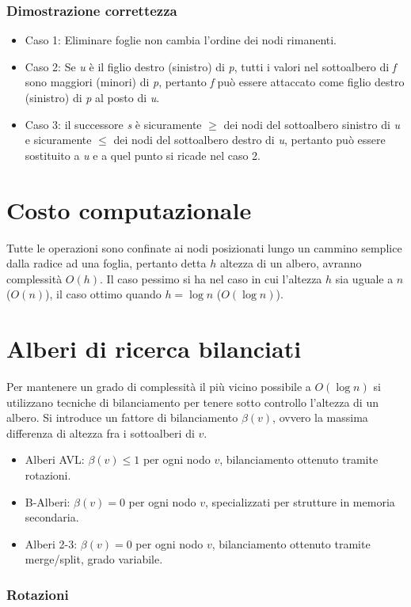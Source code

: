 \subsubsection{Dimostrazione correttezza}
\begin{itemize}
    \item Caso 1: Eliminare foglie non cambia l'ordine dei nodi rimanenti.
    \item Caso 2: Se \emph{u} \`e il figlio destro (sinistro) di \emph{p}, tutti i valori nel sottoalbero di \emph{f} sono maggiori (minori) di \emph{p},
          pertanto \emph{f} pu\`o essere attaccato come figlio destro (sinistro) di \emph{p} al posto di \emph{u}.
    \item Caso 3: il successore \emph{s} \`e sicuramente $\ge$ dei nodi del sottoalbero sinistro di \emph{u} e sicuramente $\le$ dei nodi del sottoalbero destro
          di \emph{u}, pertanto pu\`o essere sostituito a \emph{u} e a quel punto si ricade nel caso 2.
\end{itemize}
\section{Costo computazionale}
Tutte le operazioni sono confinate ai nodi posizionati lungo un cammino semplice dalla radice ad una foglia, pertanto detta $h$ altezza di un albero,
avranno complessit\`a $O(h)$. Il caso pessimo si ha nel caso in cui l'altezza $h$ sia uguale a $n$ ($O(n)$), il caso ottimo quando $h=\log n$ ($O(\log n)$).
\section{Alberi di ricerca bilanciati}
Per mantenere un grado di complessit\`a il pi\`u vicino possibile a $O(\log n)$ si utilizzano tecniche di bilanciamento per tenere sotto controllo l'altezza
di un albero. Si introduce un fattore di bilanciamento $\beta(v)$, ovvero la massima differenza di altezza fra i sottoalberi di $v$.
\begin{itemize}
    \item Alberi AVL: $\beta(v)\le 1$ per ogni nodo $v$, bilanciamento ottenuto tramite rotazioni.
    \item B-Alberi: $\beta(v)=0$ per ogni nodo $v$, specializzati per strutture in memoria secondaria.
    \item Alberi 2-3: $\beta(v)=0$ per ogni nodo $v$, bilanciamento ottenuto tramite merge/split, grado variabile.
\end{itemize}
\subsubsection{Rotazioni}
